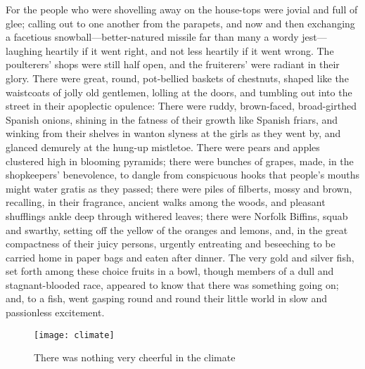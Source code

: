 For the people who were shovelling away on the house-tops were jovial and full of glee; calling out to one another from the parapets, and now and then exchanging a facetious snowball---better-natured missile far than many a wordy jest---laughing heartily if it went right, and not less heartily if it went wrong. The poulterers' shops were still half open, and the fruiterers' were radiant in their glory. There were great, round, pot-bellied baskets of chestnuts, shaped like the waistcoats of jolly old gentlemen, lolling at the doors, and tumbling out into the street in their apoplectic opulence: There were ruddy, brown-faced, broad-girthed Spanish onions, shining in the fatness of their growth like Spanish friars, and winking from their shelves in wanton slyness at the girls as they went by, and glanced demurely at the hung-up mistletoe. There were pears and apples clustered high in blooming pyramids; there were bunches of grapes, made, in the shopkeepers' benevolence, to dangle from conspicuous hooks that people's  mouths might water gratis as they passed; there were piles of filberts, mossy and brown, recalling, in their fragrance, ancient walks among the woods, and pleasant shufflings ankle deep through withered leaves; there were Norfolk Biffins, squab and swarthy, setting off the yellow of the oranges and lemons, and, in the great compactness of their juicy persons, urgently entreating and beseeching to be carried home in paper bags and eaten after dinner. The very gold and silver fish, set forth among these choice fruits in a bowl, though members of a dull and stagnant-blooded race, appeared to know that there was something going on; and, to a fish, went gasping round and round their little world in slow and passionless excitement.

\begin{figure}[p]
\centering
\texttt{[image: climate]}
\caption{There was nothing very cheerful in the climate}
\end{figure}

